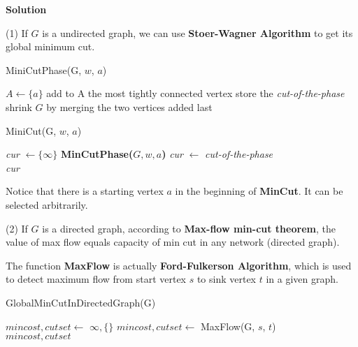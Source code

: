 \documentclass{article}
\newcommand{\<}{
    \langle}
\renewcommand{\>}{
    \rangle}
\begin{document}
{\bigskip
\noindent \textbf{Solution}

(1) If $G$ is a undirected graph, we can use \textbf{Stoer-Wagner Algorithm} to get its global minimum cut.

\begin{algorithm}[htb]
\caption{MiniCutPhase(G, $w$, $a$)}
\begin{algorithmic}[1]
\State $A \leftarrow \{a\}$
    \State add to A the most tightly connected vertex
\EndWhile
\State store the \textit{cut-of-the-phase}
\State shrink $G$ by merging the two vertices added last
\end{algorithmic}
\end{algorithm}

\begin{algorithm}[htb]
\caption{MiniCut(G, $w$, $a$)}
\begin{algorithmic}[1]
\State \textit{cur} $\leftarrow \{ \infty \}$ 
    \State \textbf{MinCutPhase($G, w, a$)}
        \textit{cur} $\leftarrow$ \textit{cut-of-the-phase}
    \EndIf
\EndWhile \\
\Return \textit{cur}
\end{algorithmic}
\end{algorithm}

Notice that there is a starting vertex $a$ in the beginning of \textbf{MinCut}. It can be selected arbitrarily.

\bigskip

(2) If $G$ is a directed graph, according to \textbf{Max-flow min-cut theorem}, the value of max flow equals capacity of min cut in any network (directed graph).

The function \textbf{MaxFlow} is actually \textbf{Ford-Fulkerson Algorithm}, which is used to detect maximum flow from start vertex $s$ to sink vertex $t$ in a given graph. 

\begin{algorithm}[htb]
\caption{GlobalMinCutInDirectedGraph(G)}
\begin{algorithmic}[1]
\State $mincost, cutset \leftarrow$ $\infty, \{\}$
        \State $mincost, cutset \leftarrow$ MaxFlow(G, $s$, $t$)
    \EndFor
\EndFor \\
\Return $mincost, cutset$
\end{algorithmic}
\end{algorithm}

}
\end{document}
